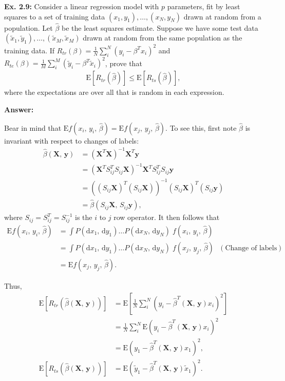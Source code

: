 \documentclass{article}
\begin{document}
\textbf{Ex. 2.9: }Consider a linear regression model with $p$ parameters, fit by least squares to a set of training data $(x_1,y_1),\ldots,(x_N,y_N)$ drawn at random from a population. Let $\hat{\beta}$ be the least squares estimate. Suppose we have some test data $(\tilde{x}_1,\tilde{y}_1),\ldots,(\tilde{x}_M,\tilde{x}_M)$ drawn at random from the same population as the training data. If $R_{tr}(\beta)=\frac1N\sum_i^N\left(y_i-\beta^Tx_i\right)^2$ and $R_{te}(\beta)=\frac1M\sum_i^M\left(\tilde{y}_i-\beta^T\tilde{x}_i\right)^2$, prove that
\begin{align}
	\mathrm E[R_{tr}(\hat{\beta})]\leq\mathrm E[R_{ts}(\hat{\beta})],
\end{align}
where the expectations are over all that is random in each expression.

\textbf{Answer:}

Bear in mind that $\mathrm Ef(x_i,\,y_i,\,\hat{\beta})=\mathrm Ef(x_j,\,y_j,\,\hat{\beta})$. To see this, first note $\hat{\beta}$ is invariant with respect to changes of labels:
\begin{align}
	\hat{\beta}(\mathbf X,\,\mathbf y)&=\left(\mathbf X^T\mathbf X\right)^{-1}\mathbf X^T\mathbf y\\
	&=\left(\mathbf X^TS_{ij}^TS_{ij}\mathbf X\right)^{-1}\mathbf X^TS_{ij}^TS_{ij}\mathbf y\\
	&=\left(\left(S_{ij}\mathbf X\right)^T\left(S_{ij}\mathbf X\right)\right)^{-1}\left(S_{ij}\mathbf X\right)^T\left(S_{ij}\mathbf y\right)\\
	&=\hat{\beta}(S_{ij}\mathbf X,\,S_{ij}\mathbf y),
\end{align}
where $S_{ij}=S_{ij}^T=S_{ij}^{-1}$ is the $i$ to $j$ row operator. It then follows that
\begin{align}
	\mathrm Ef(x_i,\,y_i,\,\hat{\beta})&=\int P(\mathrm dx_1,\,\mathrm dy_1)\ldots P(\mathrm dx_N,\,\mathrm dy_N)\;f(x_i,\,y_i,\,\hat{\beta})\\
	&=\int P(\mathrm dx_1,\,\mathrm dy_1)\ldots P(\mathrm dx_N,\,\mathrm dy_N)\;f(x_j,\,y_j,\,\hat{\beta})\text{ }\left(\text{Change of labels}\right)\\
	&=\mathrm Ef(x_j,\,y_j,\,\hat{\beta}).
\end{align}

Thus,
\begin{align}
	\mathrm E[R_{tr}(\hat{\beta}(\mathbf X,\,\mathbf y))]&=\mathrm E\left[\frac1N\sum_i^N\left(y_i-\hat{\beta}^T(\mathbf X,\,\mathbf y)x_i\right)^2\right]\\
	&=\frac1N\sum_i^N\mathrm E\left(y_i-\hat{\beta}^T(\mathbf X,\,\mathbf y)x_i\right)^2\\
	&=\mathrm E\left(y_1-\hat{\beta}^T(\mathbf X,\,\mathbf y)x_1\right)^2,\\
	\mathrm E[R_{ts}(\hat{\beta}(\mathbf X,\,\mathbf y))]&=\mathrm E\left(\tilde{y}_1-\hat{\beta}^T(\mathbf X,\,\mathbf y)\tilde{x}_1\right)^2.
\end{align}
\end{document}
